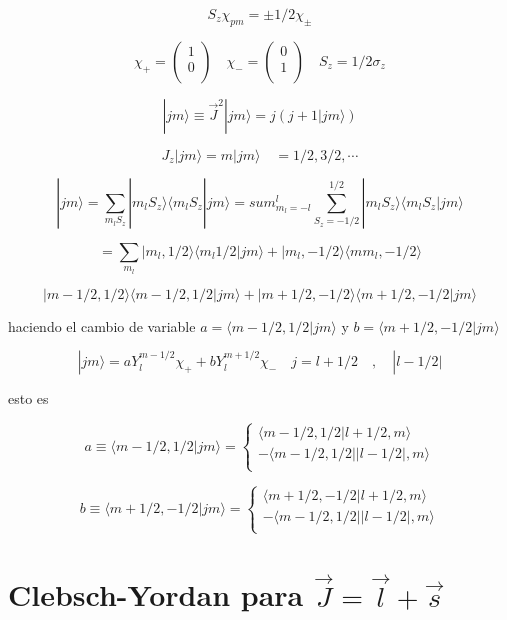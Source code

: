 \documentclass{report}
\begin{document}
\[S_z \chi_{pm} = \pm 1/2 \chi _{\pm}\]

\[\chi _{+} =  \left ( \begin{array}{cc}
 1   \\
 0   \\
 \end{array} \right) \quad \chi_{-} = \left ( \begin{array}{cc}
 0   \\
 1   \\
 \end{array} \right) \quad S_z = 1/2 \sigma_z \]

\[|jm \rangle \equiv \overrightarrow{J}^2 |jm \rangle = j (j+1 |jm \rangle)\]

\[J_z |jm \rangle = m |jm \rangle \quad = 1/2,3/2, \cdots \]

\[|jm \rangle = \sum _{m_{l}S_{z}} |m_{l} S_{z} \rangle \langle m_{l}S_z | jm \rangle = sum_{m_{l} = -l}^{l} \sum_{S_z = -1/2}^{1/2} |m_l S_z \rangle \langle m_l S_z | jm \rangle \]

\[= \sum_{m_{l}} |m_l , 1/2 \rangle \langle m_l 1/2 |jm \rangle + |m_l , -1/2 \rangle \langle m m_l , -1/2\rangle\]

\[|m- 1/2 , 1/2 \rangle \langle m -1/2,1/2 |jm \rangle + |m +1/2 , -1/2 \rangle \langle m+1/2 , -1/2 |jm \rangle \]

haciendo el cambio de variable $a= \langle m -1/2,1/2 |jm \rangle $ y $b=\langle m+1/2 , -1/2 |jm \rangle$

\[| jm \rangle = a Y_{l}^{m-1/2} \chi_{+} + b 	Y_{l}^{m+1/2} \chi_{-} \quad j = l + 1/2 \quad , \quad  |l-1/2|\]

esto es

\[a \equiv \langle m -1/2,1/2 |jm \rangle =
  \begin{cases}
     \langle m -1/2,1/2 |l+1/2,m \rangle \\
    -\langle m -1/2,1/2 ||l-1/2| ,m \rangle \\
  \end{cases}\]

\[b \equiv \langle m +1/2, -1/2 |jm \rangle =
  \begin{cases}
     \langle m +1/2, -1/2 |l+1/2,m \rangle \\
    -\langle m -1/2,1/2 ||l-1/2| ,m \rangle \\  
  \end{cases}\]

\section{Clebsch-Yordan para $\overrightarrow{J} = \overrightarrow{l}+\overrightarrow{s}$}
\end{document}
